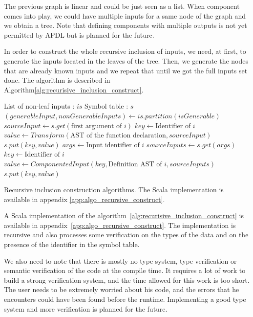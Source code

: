 The previous graph is linear and could be just seen as a list. When component
comes into play, we could have multiple inputs for a same node of the graph and
we obtain a tree. Note that defining components with multiple outputs is not yet
permitted by \gls{APDL} but is planned for the future.

In order to construct the whole recursive inclusion of inputs, we need, at first,
to generate the inputs located in the leaves of the tree. Then, we generate
the nodes that are already known inputs and we repeat that
until we got the full inputs set done. The algorithm is described in
Algorithm\ref{alg:recurisive_inclusion_construct}.

\begin{algorithm}[!htbp]
  \centering
  \begin{algorithmic}[5]
    \State List of non-leaf inputs : $is$
    \State Symbol table : $s$
    \Repeat
    \State $(generableInput,nonGenerableInputs) \gets is.partition(isGenerable)$
    \State $sourceInput \gets s.get(\text{first argument of $i$})$
    \State $key \gets \text{Identifier of $i$}$
    \State $value \gets Transform(\text{AST of the function declaration},sourceInput)$
    \State $s.put(key,value)$
    \EndIf
    \State $args \gets \text{Input identifier of $i$}$
    \State $sourceInputs \gets s.get(args)$
    \State $key \gets \text{Identifier of $i$}$
    \State $value \gets ComponentedInput(key,\text{Definition AST of $i$},sourceInputs)$
    \State $s.put(key,value)$
    \EndIf
    \EndFor
  \end{algorithmic}
  \caption[Recursive inclusion construction]{Recursive inclusion
    construction algorithms. The Scala implementation is available in appendix \ref{app:algo_recursive_construct}.}
  \label{alg:recurisive_inclusion_construct}
\end{algorithm}

A Scala implementation of the algorithm~\ref{alg:recurisive_inclusion_construct}
is available in appendix~\ref{app:algo_recursive_construct}. The implementation
is recursive and also processes some verification on the types of the data and on the
presence of the identifier in the symbol table.

We also need to note that there is mostly no type system, type verification or
semantic verification of the code at the compile time. It requires a lot of work
to build a strong verification system, and the time allowed for this work is too
short. The user needs to be extremely worried about his code, and the
errors that he encounters could have been found before the runtime.
Implementing a good type system and more verification is planned for the future.

